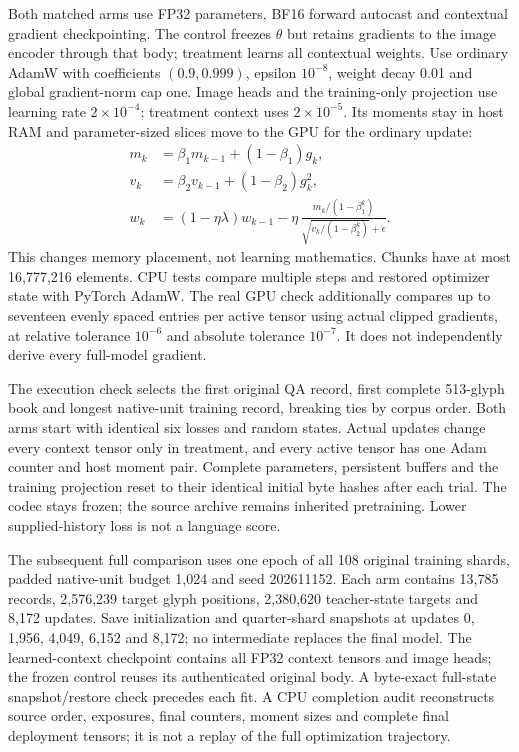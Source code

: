 Both matched arms use FP32 parameters, BF16 forward autocast and contextual
gradient checkpointing. The control freezes $\theta$ but retains gradients to
the image encoder through that body; treatment learns all contextual weights.
Use ordinary AdamW with coefficients $(0.9,0.999)$, epsilon $10^{-8}$, weight
decay 0.01 and global gradient-norm cap one. Image heads and the training-only
projection use learning rate $2\times10^{-4}$; treatment context uses
$2\times10^{-5}$. Its moments stay in host RAM and parameter-sized slices move
to the GPU for the ordinary update:
\begin{equation}
 \begin{aligned}
 m_k&=\beta_1m_{k-1}+(1-\beta_1)g_k,\\
 v_k&=\beta_2v_{k-1}+(1-\beta_2)g_k^2,\\
 w_k&=(1-\eta\lambda)w_{k-1}
 -\eta\,\frac{m_k/(1-\beta_1^k)}
 {\sqrt{v_k/(1-\beta_2^k)}+\epsilon}.
 \end{aligned}
 \label{eq:host-moment-adamw}
\end{equation}
This changes memory placement, not learning mathematics. Chunks have at most
16,777,216 elements. CPU tests compare multiple steps and restored optimizer
state with PyTorch AdamW. The real GPU check additionally compares up to
seventeen evenly spaced entries per active tensor using actual clipped
gradients, at relative tolerance $10^{-6}$ and absolute tolerance $10^{-7}$.
It does not independently derive every full-model gradient.

The execution check selects the first original QA record, first complete
513-glyph book and longest native-unit training record, breaking ties by corpus
order. Both arms start with identical six losses and random states. Actual
updates change every context tensor only in treatment, and every active tensor
has one Adam counter and host moment pair. Complete parameters, persistent
buffers and the training projection reset to their identical initial byte
hashes after each trial. The codec stays frozen; the source archive remains
inherited pretraining. Lower supplied-history loss is not a language score.

The subsequent full comparison uses one epoch of all 108 original training
shards, padded native-unit budget 1,024 and seed 202611152. Each arm contains
13,785 records, 2,576,239 target glyph positions, 2,380,620 teacher-state targets
and 8,172 updates. Save initialization and quarter-shard snapshots at updates
0, 1,956, 4,049, 6,152 and 8,172; no intermediate replaces the final model.
The learned-context checkpoint contains all FP32 context tensors and image
heads; the frozen control reuses its authenticated original body. A byte-exact
full-state snapshot/restore check precedes each fit. A CPU completion audit
reconstructs source order, exposures, final counters, moment sizes and complete
final deployment tensors; it is not a replay of the full optimization trajectory.

